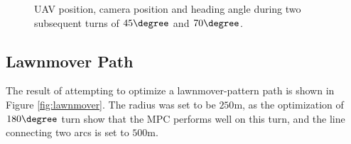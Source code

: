 \begin{figure}
	\caption{UAV position, camera position and heading angle during two subsequent turns of $45\degree$ and $70\degree$.}
	\label{fig:paths_cur_150m}
\end{figure}


\subsection{Lawnmover Path}
\label{subsec:lawnmover}

The result of attempting to optimize a lawnmover-pattern path is shown in Figure \ref{fig:lawnmover}. The radius was set to be $250$m, as the optimization of $180\degree$ turn show that the MPC performs well on this turn, and the line connecting two arcs is set to $500$m.

